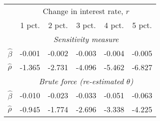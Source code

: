 \begin{tabular}{l*{5}{c}} \toprule 
& \multicolumn{5}{c}{ Change in interest rate, $r$ } \\ \cmidrule(lr){2-6}  
& 1 pct. & 2 pct. & 3 pct. & 4 pct. & 5 pct. \\ \midrule 
& \multicolumn{5}{c}{ \emph{Sensitivity measure} } \\ \cmidrule(lr){2-6}  
 $\hat{\beta}$ & -0.001 & -0.002 & -0.003 & -0.004 & -0.005 \\
 $\hat{\rho}$ & -1.365 & -2.731 & -4.096 & -5.462 & -6.827 \\\cmidrule(lr){2-6}  
& \multicolumn{5}{c}{ \emph{Brute force (re-estimated $\theta$)} } \\ \cmidrule(lr){2-6}  
 $\hat{\beta}$ & -0.010 & -0.023 & -0.033 & -0.051 & -0.063 \\ 
 $\hat{\rho}$  & -0.945  & -1.774  & -2.696  & -3.338  & -4.225 \\ \bottomrule  \end{tabular} 
